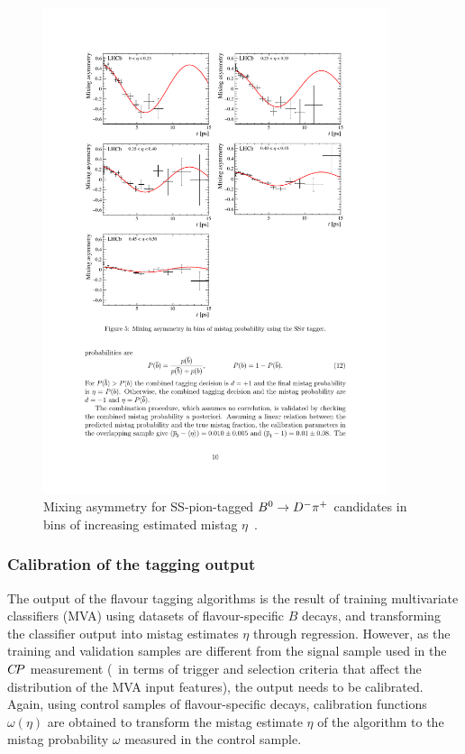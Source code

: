 \begin{figure}[t]
	\begin{center}
		\includegraphics[width=0.9\textwidth]{04Flavourtagging/figs/Dilution.pdf}
	\end{center}
        \vspace{-2mm}
	\caption{Mixing asymmetry for SS-pion-tagged $B^0\rightarrow D^-\pi^+$ candidates in bins of increasing estimated mistag $\eta$~\cite{LHCb-PAPER-2016-039}.}
	\label{fig:dilution}
\end{figure}


\subsubsection{Calibration of the tagging output}
\label{sec:tagging:calibration}

The output of the flavour tagging algorithms is the result of training
multivariate classifiers (MVA) using datasets of flavour-specific $B$ decays, and
transforming the classifier output into mistag estimates $\eta$ through
regression. However, as the training and validation samples are different
from the signal sample used in the $C\!P$ measurement (\eg~in terms of trigger
and selection criteria that affect the distribution of the MVA input features),
the output needs to be calibrated. Again, using control samples of flavour-specific decays, 
calibration functions $\omega(\eta)$ are obtained to
transform the mistag estimate $\eta$ of the algorithm to the mistag probability
$\omega$ measured in the control sample.

